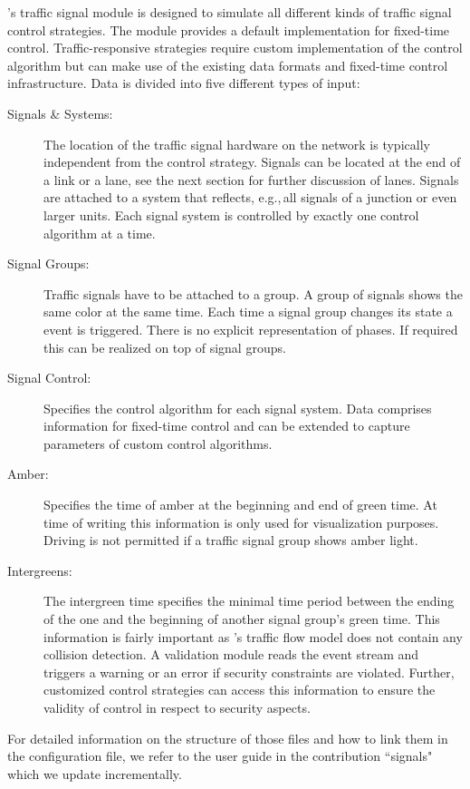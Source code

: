's traffic signal module is designed to simulate all different kinds of traffic signal control strategies. 
The module provides a default implementation for fixed-time control. 
Traffic-responsive strategies require custom implementation of the control algorithm but can make use of the existing data formats and fixed-time control infrastructure. 
Data is divided into five different types of input:
\begin{description}
	\item[Signals \& Systems:] The location of the traffic signal hardware on the network is typically independent from the control strategy. 
		Signals can be located at the end of a link or a lane, see the next section for further discussion of lanes. Signals are attached to a system that reflects, e.g.,\,all signals of a junction or even larger units. 
		Each signal system is controlled by exactly one control algorithm at a time.  
	\item[Signal Groups:] Traffic signals have to be attached to a group. 
		A group of signals shows the same color at the same time. 
		Each time a signal group changes its state a  event is triggered. 
		There is no explicit representation of phases. 
		If required this can be realized on top of signal groups.  
	\item[Signal Control:] Specifies the control algorithm for each signal system. 
		Data comprises information for fixed-time control and can be extended to capture parameters of custom control algorithms. 
	\item[Amber:] Specifies the time of amber at the beginning and end of green time. 
		At time of writing this information is only used for visualization purposes. 
		Driving is not permitted if a traffic signal group shows amber light. 
	\item[Intergreens:] The intergreen time specifies the minimal time period between the ending of the one and the beginning of another signal group's green time.  
		This information is fairly important as 's traffic flow model does not contain any collision detection. 
		A validation module reads the event stream and triggers a warning or an error if security constraints are violated. 
		Further, customized control strategies can access this information to ensure the validity of control in respect to security aspects.    
\end{description}

For detailed information on the structure of those files and how to link them in the  configuration file, we refer to the user guide in the contribution ``signals" which we update incrementally.

